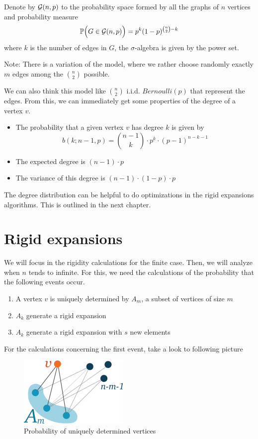 \begin{defini}
Denote by $\mathcal{G}(n,p)$ to the probability space formed by all the graphs of $n$ vertices and probability measure 
$$ \mathbb{P}\Big(G\in \mathcal{G}(n,p)\Big) = p^{k} (1-p)^{\binom{n}{2}-k} $$
where $k$ is the number of edges in $G$, the $\sigma$-algebra is given by the power set.
\end{defini}

Note: There is a variation of the model, where we rather choose randomly exactly $m$ edges among the $\binom{n}{2}$ possible.

We can also think this model like $\binom{n}{2}$ i.i.d. $Bernoulli(p)$ that represent the edges. From this, we can immediately get some properties of the degree of a vertex $v$.

\begin{itemize}
\item The probability that a given vertex $v$ has degree $k$ is given by
$$b(k; n-1,p) = \binom{n-1}{k} \cdot p^{k} \cdot (p-1)^{n-k-1}$$
\item The expected degree is $(n-1)\cdot p$
\item The variance of this degree is $(n-1)\cdot (1-p) \cdot p$
\end{itemize}

The degree distribution can be helpful to do optimizations in the rigid expansions algorithms. This is outlined in the next chapter.

\section{Rigid expansions}

 We will focus in the rigidity calculations for the finite case. Then, we will analyze when $n$ tends to infinite. For this, we need the calculations of the probability that the following events occur.

\begin{enumerate}
\item A vertex $v$ is uniquely determined by $A_{m}$, a subset of vertices of size $m$
\item $A_k$ generate a rigid expansion
\item $A_k$ generate a rigid expansion with $s$ new elements
\end{enumerate}

For the calculations concerning the first event, take a look to following picture

\begin{figure}[h!]
	\centering
	\includegraphics[scale=1]{Figures/uni.png}
	\caption{Probability of uniquely determined vertices}
\end{figure}

